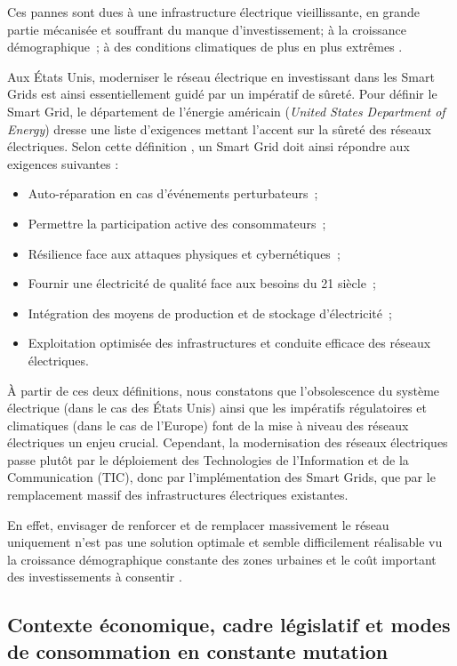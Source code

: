 Ces pannes sont dues à une infrastructure électrique vieillissante, en grande partie mécanisée et souffrant du manque d'investissement; à la croissance démographique~; à des conditions climatiques de plus en plus extrêmes \cite{outages}.

Aux États Unis, moderniser le réseau électrique en investissant dans les Smart Grids est ainsi essentiellement guidé par un impératif de sûreté. Pour définir le Smart Grid, le département de l'énergie américain (\textit{United States
Department of Energy}) dresse une liste d'exigences mettant l'accent sur la sûreté des réseaux électriques. Selon cette définition \cite{USDE}, un Smart Grid doit ainsi répondre aux exigences suivantes :
\begin{itemize}
\item Auto-réparation en cas d'événements perturbateurs~;
\item Permettre la participation active des consommateurs~; 
\item Résilience face aux attaques physiques et cybernétiques~;
\item Fournir une électricité de qualité face aux besoins du 21 siècle~;
\item Intégration des moyens de production et de stockage d'électricité~;
\item Exploitation optimisée des infrastructures et conduite efficace des réseaux électriques.
\end{itemize} 

À partir de ces deux définitions, nous constatons que l'obsolescence du système électrique (dans le cas des États Unis) ainsi que les impératifs régulatoires et climatiques (dans le cas de l'Europe) font de la mise à niveau des réseaux électriques un enjeu crucial. Cependant, la modernisation des réseaux électriques passe plutôt par le déploiement des Technologies de l'Information et de la Communication (TIC), donc par l'implémentation des Smart Grids, que par le remplacement massif des infrastructures électriques existantes.

En effet, envisager de renforcer et de remplacer massivement le réseau uniquement n'est pas une solution optimale et semble difficilement réalisable vu la croissance démographique constante des zones urbaines et le coût important des investissements à consentir \cite{cre}.

\subsection{Contexte économique, cadre législatif et modes de con\-sommation en constante mutation}

